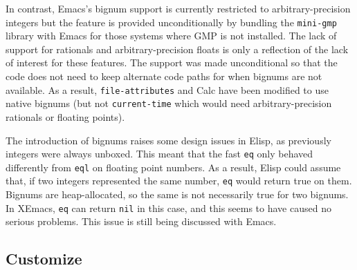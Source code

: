 \documentclass[format=acmsmall, review=false, screen=true]{acmart}
\newcommand \Elisp {Elisp}
\begin{document}
In contrast, Emacs's bignum support is currently restricted to
arbitrary-precision integers but the feature is provided unconditionally by
bundling the \texttt{mini-gmp} library with Emacs for those systems where
GMP is not installed.  The lack of support for rationals and
arbitrary-precision floats is only a reflection of the lack of interest for
these features.  The support was made unconditional so that the code does
not need to keep alternate code paths for when bignums are not available.
As a result, \texttt{file-attributes} and Calc have been modified to use
native bignums (but not \texttt{current-time} which would need
arbitrary-precision rationals or floating points).

The introduction of bignums raises some design issues in \Elisp, as
previously integers were always unboxed.  This meant that the fast
\texttt{eq} only behaved differently from \texttt{eql} on floating point
numbers.  As a result, \Elisp{} could assume that, if two integers
represented the same number, \texttt{eq} would return true on them.
Bignums are heap-allocated, so the same is not necessarily true for two
bignums.  In XEmacs, \texttt{eq} can return \texttt{nil} in this case, and
this seems to have caused no serious problems.
This issue is still being discussed with Emacs.

\subsection{Customize}






\end{document}
